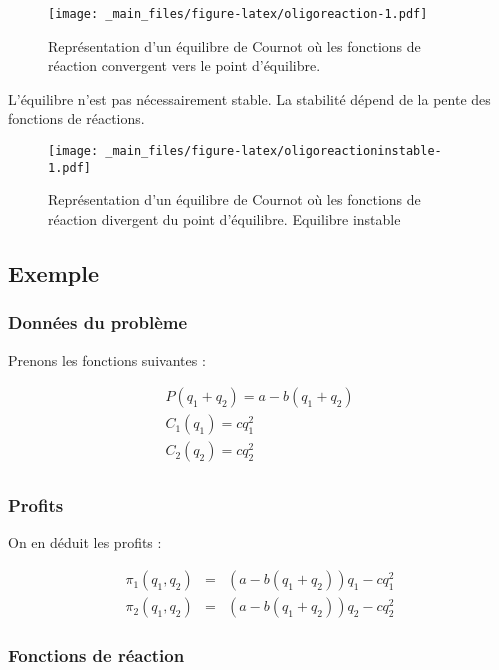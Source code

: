 \documentclass[
]{book}
\theoremstyle{definition}
\theoremstyle{definition}
\theoremstyle{definition}
\theoremstyle{definition}
\theoremstyle{remark}
\begin{document}
\begin{figure}
\centering
\texttt{[image: \_main\_files/figure-latex/oligoreaction-1.pdf]}
\caption{\label{fig:oligoreaction}Représentation d'un équilibre de Cournot où les fonctions de réaction convergent vers le point d'équilibre.}
\end{figure}

L'équilibre n'est pas nécessairement stable.
La stabilité dépend de la pente des fonctions de réactions.

\begin{figure}
\centering
\texttt{[image: \_main\_files/figure-latex/oligoreactioninstable-1.pdf]}
\caption{\label{fig:oligoreactioninstable}Représentation d'un équilibre de Cournot où les fonctions de réaction divergent du point d'équilibre. Equilibre instable}
\end{figure}

\hypertarget{exemple}{%
\subsection{Exemple}\label{exemple}}

\hypertarget{donnuxe9es-du-probluxe8me}{%
\subsubsection{Données du problème}\label{donnuxe9es-du-probluxe8me}}

Prenons les fonctions suivantes :

\[
\begin{array}{l}
P(q_1+q_2) = a - b(q_1+q_2)\\
C_1(q_1) = cq^2_1 \\
C_2(q_2) = cq^2_2 \\
\end{array}
\]

\hypertarget{profits}{%
\subsubsection{Profits}\label{profits}}

On en déduit les profits :

\[
\begin{array}{rcl}
\pi_1(q_1, q_2) &=& \left(a-b(q_1+q_2)\right)q_1-cq_1^2\\
\pi_2(q_1, q_2) &=& \left(a-b(q_1+q_2)\right)q_2-cq_2^2
\end{array}
\]

\hypertarget{fonctions-de-ruxe9action}{%
\subsubsection{Fonctions de réaction}\label{fonctions-de-ruxe9action}}
\end{document}
